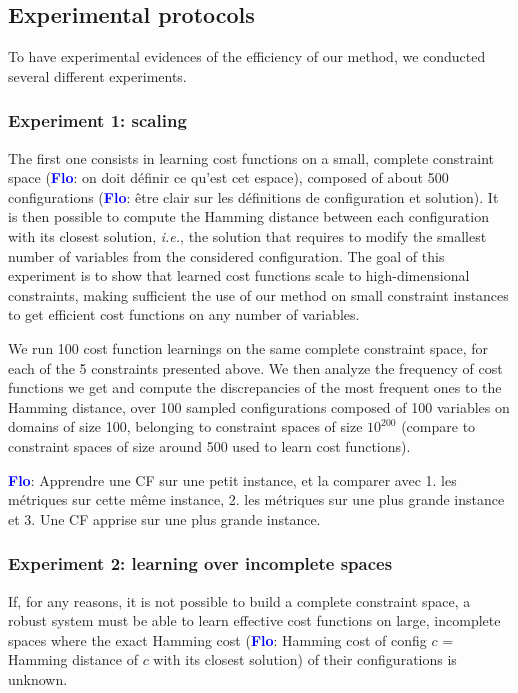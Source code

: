 \documentclass{article}
\newcommand{\ie}{\textit{i.e.}}
\newcommand{\flo}{\textcolor{blue}{\bf Flo}\xspace}
\begin{document}
\subsection{Experimental protocols}

To have  experimental evidences  of the efficiency  of our  method, we
conducted several different experiments.

\subsubsection{Experiment 1: scaling}

The first one consists in learning cost functions on a small, complete
constraint  space  (\flo:  on  doit définir  ce  qu'est  cet  espace),
composed  of  about  500  configurations (\flo:  être  clair  sur  les
définitions de  configuration et  solution).  It  is then  possible to
compute  the  Hamming distance  between  each  configuration with  its
closest  solution,  \ie, the  solution  that  requires to  modify  the
smallest number  of variables  from the considered  configuration. The
goal of this  experiment is to show that learned  cost functions scale
to  high-dimensional constraints,  making  sufficient the  use of  our
method on small  constraint instances to get  efficient cost functions
on any number of variables.

We run  100 cost  function learnings on  the same  complete constraint
space, for each of the 5  constraints presented above. We then analyze
the frequency of  cost functions we get and  compute the discrepancies
of the  most frequent ones to  the Hamming distance, over  100 sampled
configurations  composed of  100  variables on  domains  of size  100,
belonging  to  constraint  spaces   of  size  $10^{200}$  (compare  to
constraint spaces of size around 500 used to learn cost functions).

\flo: Apprendre une CF sur une petit instance, et la comparer avec 1. les
métriques  sur cette  même instance,  2.  les métriques  sur une  plus
grande instance et 3. Une CF apprise sur une plus grande instance.

\subsubsection{Experiment 2: learning over incomplete spaces}

If, for any reasons, it is not possible to build a complete constraint
space, a robust system must be  able to learn effective cost functions
on  large,  incomplete spaces  where  the  exact Hamming  cost  (\flo:
Hamming cost of config $c$ =  Hamming distance of $c$ with its closest
solution) of their configurations is unknown.
\end{document}
